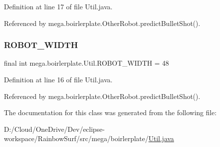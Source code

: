 Definition at line 17 of file Util.\+java.



Referenced by mega.\+boirlerplate.\+Other\+Robot.\+predict\+Bullet\+Shot().

\mbox{\label{classmega_1_1boirlerplate_1_1_util_aa71f5f5fffc472da7ab047be834ae531}} 
\subsubsection{\texorpdfstring{R\+O\+B\+O\+T\+\_\+\+W\+I\+D\+TH}{ROBOT\_WIDTH}}
{\footnotesize\ttfamily final int mega.\+boirlerplate.\+Util.\+R\+O\+B\+O\+T\+\_\+\+W\+I\+D\+TH = 48\hspace{0.3cm}{\ttfamily [static]}}



Definition at line 16 of file Util.\+java.



Referenced by mega.\+boirlerplate.\+Other\+Robot.\+predict\+Bullet\+Shot().



The documentation for this class was generated from the following file\+:\begin{DoxyCompactItemize}
\item 
D\+:/\+Cloud/\+One\+Drive/\+Dev/eclipse-\/workspace/\+Rainbow\+Surf/src/mega/boirlerplate/\hyperlink{_util_8java}{Util.\+java}\end{DoxyCompactItemize}
